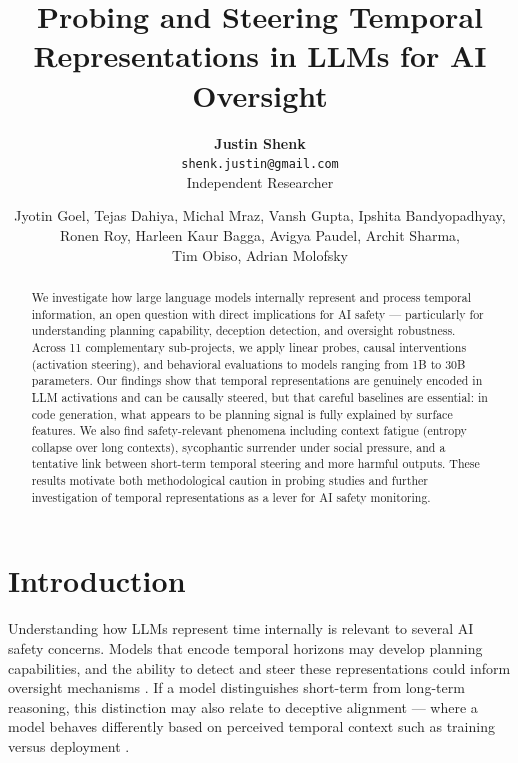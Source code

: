 \documentclass[final]{sparreport}
\title{Probing and Steering Temporal Representations in LLMs for AI Oversight}
\author{
  \textbf{Justin Shenk}\\
  \texttt{shenk.justin@gmail.com}\\
  Independent Researcher
  \and
  Jyotin Goel,
  Tejas Dahiya,
  Michal Mraz,
  Vansh Gupta,
  Ipshita Bandyopadhyay,\\
  Ronen Roy,
  Harleen Kaur Bagga,
  Avigya Paudel,
  Archit Sharma,\\
  Tim Obiso,
  Adrian Molofsky
}
\begin{document}
\maketitle

\begin{abstract}
We investigate how large language models internally represent and process temporal information, an open question with direct implications for AI safety --- particularly for understanding planning capability, deception detection, and oversight robustness. Across 11 complementary sub-projects, we apply linear probes, causal interventions (activation steering), and behavioral evaluations to models ranging from 1B to 30B parameters. Our findings show that temporal representations are genuinely encoded in LLM activations and can be causally steered, but that careful baselines are essential: in code generation, what appears to be planning signal is fully explained by surface features. We also find safety-relevant phenomena including context fatigue (entropy collapse over long contexts), sycophantic surrender under social pressure, and a tentative link between short-term temporal steering and more harmful outputs. These results motivate both methodological caution in probing studies and further investigation of temporal representations as a lever for AI safety monitoring.
\end{abstract}


\section{Introduction}

Understanding how LLMs represent time internally is relevant to several AI safety concerns. Models that encode temporal horizons may develop planning capabilities, and the ability to detect and steer these representations could inform oversight mechanisms \cite{li2023inference, rimsky2024steering}. If a model distinguishes short-term from long-term reasoning, this distinction may also relate to deceptive alignment \cite{hubinger2019risks} --- where a model behaves differently based on perceived temporal context such as training versus deployment \cite{park2023ai}.
\end{document}
